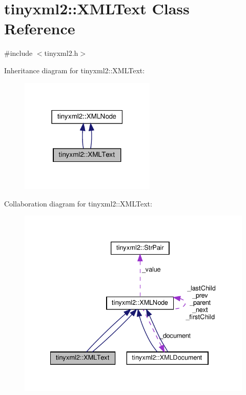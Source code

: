 \hypertarget{classtinyxml2_1_1XMLText}{}\section{tinyxml2\+:\+:X\+M\+L\+Text Class Reference}
\label{classtinyxml2_1_1XMLText}


{\ttfamily \#include $<$tinyxml2.\+h$>$}



Inheritance diagram for tinyxml2\+:\+:X\+M\+L\+Text\+:
\nopagebreak
\begin{figure}[H]
\begin{center}
\leavevmode
\includegraphics[width=183pt]{classtinyxml2_1_1XMLText__inherit__graph}
\end{center}
\end{figure}


Collaboration diagram for tinyxml2\+:\+:X\+M\+L\+Text\+:
\nopagebreak
\begin{figure}[H]
\begin{center}
\leavevmode
\includegraphics[width=334pt]{classtinyxml2_1_1XMLText__coll__graph}
\end{center}
\end{figure}
